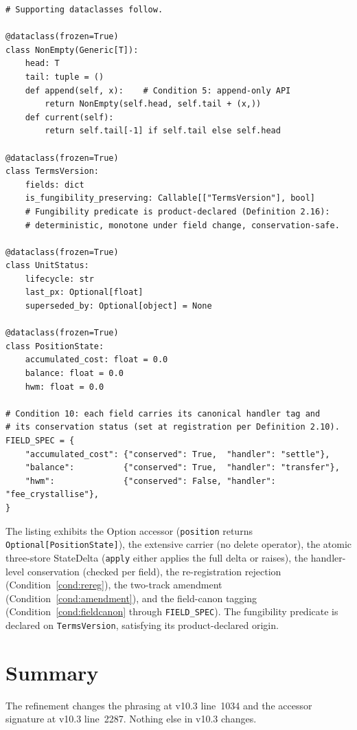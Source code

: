 \documentclass[11pt,a4paper]{article}
\begin{document}
\begin{lstlisting}[language=pythonstyle]
# Supporting dataclasses follow.

@dataclass(frozen=True)
class NonEmpty(Generic[T]):
    head: T
    tail: tuple = ()
    def append(self, x):    # Condition 5: append-only API
        return NonEmpty(self.head, self.tail + (x,))
    def current(self):
        return self.tail[-1] if self.tail else self.head

@dataclass(frozen=True)
class TermsVersion:
    fields: dict
    is_fungibility_preserving: Callable[["TermsVersion"], bool]
    # Fungibility predicate is product-declared (Definition 2.16):
    # deterministic, monotone under field change, conservation-safe.

@dataclass(frozen=True)
class UnitStatus:
    lifecycle: str
    last_px: Optional[float]
    superseded_by: Optional[object] = None

@dataclass(frozen=True)
class PositionState:
    accumulated_cost: float = 0.0
    balance: float = 0.0
    hwm: float = 0.0

# Condition 10: each field carries its canonical handler tag and
# its conservation status (set at registration per Definition 2.10).
FIELD_SPEC = {
    "accumulated_cost": {"conserved": True,  "handler": "settle"},
    "balance":          {"conserved": True,  "handler": "transfer"},
    "hwm":              {"conserved": False, "handler": "fee_crystallise"},
}
\end{lstlisting}

\noindent The listing exhibits the Option accessor (\texttt{position} returns \texttt{Optional[PositionState]}), the extensive carrier (no delete operator), the atomic three-store StateDelta (\texttt{apply} either applies the full delta or raises), the handler-level conservation (checked per field), the re-registration rejection (Condition~\ref{cond:rereg}), the two-track amendment (Condition~\ref{cond:amendment}), and the field-canon tagging (Condition~\ref{cond:fieldcanon} through \texttt{FIELD\_SPEC}). The fungibility predicate is declared on \texttt{TermsVersion}, satisfying its product-declared origin.

\clearpage
\section{Summary}
\label{sec:summary}

The refinement changes the phrasing at v10.3 line~1034 and the accessor signature at v10.3 line~2287. Nothing else in v10.3 changes.
\end{document}
